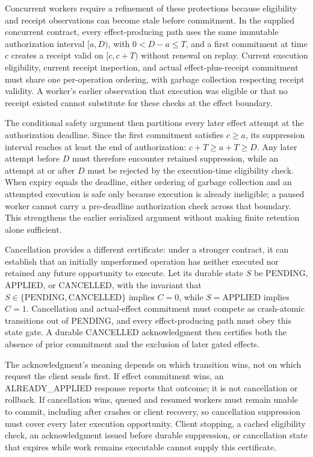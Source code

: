 \documentclass[11pt]{article}
\begin{document}
Concurrent workers require a refinement of these protections because eligibility and receipt observations can become stale before commitment. In the supplied concurrent contract, every effect-producing path uses the same immutable authorization interval $[a,D)$, with $0<D-a\leq T$, and a first commitment at time $c$ creates a receipt valid on $[c,c+T)$ without renewal on replay. Current execution eligibility, current receipt inspection, and actual effect-plus-receipt commitment must share one per-operation ordering, with garbage collection respecting receipt validity. A worker\textquoteright{}s earlier observation that execution was eligible or that no receipt existed cannot substitute for these checks at the effect boundary.

The conditional safety argument then partitions every later effect attempt at the authorization deadline. Since the first commitment satisfies $c\geq a$, its suppression interval reaches at least the end of authorization: $c+T\geq a+T\geq D$. Any later attempt before $D$ must therefore encounter retained suppression, while an attempt at or after $D$ must be rejected by the execution-time eligibility check. When expiry equals the deadline, either ordering of garbage collection and an attempted execution is safe only because execution is already ineligible; a paused worker cannot carry a pre-deadline authorization check across that boundary. This strengthens the earlier serialized argument without making finite retention alone sufficient.

Cancellation provides a different certificate: under a stronger contract, it can establish that an initially unperformed operation has neither executed nor retained any future opportunity to execute. Let its durable state $S$ be PENDING, APPLIED, or CANCELLED, with the invariant that $S\in\{\mathrm{PENDING},\mathrm{CANCELLED}\}$ implies $C=0$, while $S=\mathrm{APPLIED}$ implies $C=1$. Cancellation and actual-effect commitment must compete as crash-atomic transitions out of PENDING, and every effect-producing path must obey this state gate. A durable CANCELLED acknowledgment then certifies both the absence of prior commitment and the exclusion of later gated effects.

The acknowledgment\textquoteright{}s meaning depends on which transition wins, not on which request the client sends first. If effect commitment wins, an ALREADY\_\allowbreak{}APPLIED response reports that outcome; it is not cancellation or rollback. If cancellation wins, queued and resumed workers must remain unable to commit, including after crashes or client recovery, so cancellation suppression must cover every later execution opportunity. Client stopping, a cached eligibility check, an acknowledgment issued before durable suppression, or cancellation state that expires while work remains executable cannot supply this certificate.
\end{document}

